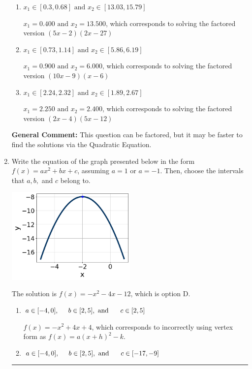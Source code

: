 \documentclass{extbook}[14pt]
\newcommand{\litem}[1]{\item #1

\rule{\textwidth}{0.4pt}}
\begin{document}
\begin{enumerate}
{\begin{enumerate}[label=\Alph*.]
$x_1 = 12.000 \text{ and } x_2 = 45.000$, which corresponds to solving the factored version $(x -12)(x -45)$
\item \( x_1 \in [0.3, 0.68] \text{ and } x_2 \in [13.03, 15.79] \)

$x_1 = 0.400 \text{ and } x_2 = 13.500$, which corresponds to solving the factored version $(5x -2)(2x -27)$
\item \( x_1 \in [0.73, 1.14] \text{ and } x_2 \in [5.86, 6.19] \)

$x_1 = 0.900 \text{ and } x_2 = 6.000$, which corresponds to solving the factored version $(10x -9)(x -6)$
\item \( x_1 \in [2.24, 2.32] \text{ and } x_2 \in [1.89, 2.67] \)

$x_1 = 2.250 \text{ and } x_2 = 2.400$, which corresponds to solving the factored version $(2x -4)(5x -12)$
\end{enumerate}

\textbf{General Comment:} This question can be factored, but it may be faster to find the solutions via the Quadratic Equation.
}
\litem{
Write the equation of the graph presented below in the form $f(x)=ax^2+bx+c$, assuming  $a=1$ or $a=-1$. Then, choose the intervals that $a, b,$ and $c$ belong to.

\begin{center}
    \includegraphics[width=0.5\textwidth]{../Figures/quadraticGraphToEquationCopyB.png}
\end{center}


The solution is \( f(x) = -x^{2} -4 x -12 \), which is option D.\begin{enumerate}[label=\Alph*.]
\item \( a \in [-4, 0], \hspace*{5mm} b \in [2, 5], \text{ and } \hspace*{5mm} c \in [2, 5] \)

$f(x)=-x^{2} +4 x + 4$, which corresponds to incorrectly using vertex form as $f(x) = a(x+h)^2 - k$.
\item \( a \in [-4, 0], \hspace*{5mm} b \in [2, 5], \text{ and } \hspace*{5mm} c \in [-17, -9] \)


\end{enumerate}}
\end{enumerate}
\end{document}

